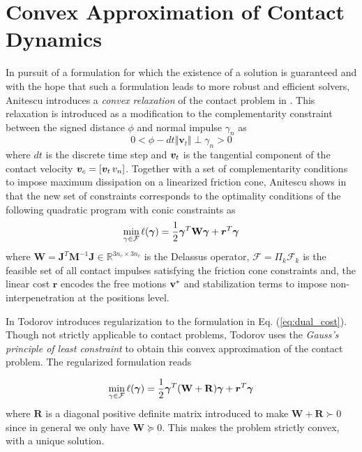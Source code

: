 \section{Convex Approximation of Contact Dynamics}
\label{sec:previous_work}


In pursuit of a formulation for which the existence of a solution is guaranteed
and with the hope that such a formulation leads to more robust and efficient
solvers, Anitescu introduces a \textit{convex relaxation} of the contact problem in
\cite{bib:anitescu2006}. This relaxation is introduced as a modification to the
complementarity constraint between the signed distance $\phi$ and normal impulse
$\gamma_n$ as
\begin{equation}
	0 < \phi - dt \Vert {\bm v}_t \Vert \perp \gamma_n > 0
	\label{eq:convex_relaxation_complementarity_condition}
\end{equation}
where $dt$ is the discrete time step and ${\bm{v}}_t$ is the tangential component
of the contact velocity ${\bm{v}}_c = [{\bm{v}}_t\,v_n]$. Together with a set of
complementarity conditions to impose maximum dissipation on a linearized
friction cone, Anitescu shows in \cite{bib:anitescu2006} that the new set of
constraints corresponds to the optimality conditions of the following quadratic
program with conic constraints as
\begin{eqnarray}
	\min_{\gamma\in \mathcal{F}} \ell(\bgamma) =
	\frac{1}{2}\bgamma^T\mathbf{W}\bgamma + {\bm r}^T
	\bgamma
	\label{eq:dual_cost}
\end{eqnarray}
where $\mathbf{W} =
\mathbf{J}^T\mathbf{M}^{-1}\mathbf{J}\in\mathbb{R}^{3n_c\times 3n_c}$ is the
Delassus operator, $\mathcal{F} = \Pi_k \mathcal{F}_k$ is the feasible set of
all contact impulses satisfying the friction cone constraints and, the linear
cost ${\bm r}$ encodes the free motions ${\mathbf{v}}^*$ and stabilization terms to
impose non-interpenetration at the positions level.

In \cite{bib:todorov2011, bib:todorov2014} Todorov introduces regularization to
the formulation in Eq. (\ref{eq:dual_cost}). Though not strictly applicable to
contact problems, Todorov uses the \textit{Gauss's principle of least
constraint} to obtain this convex approximation of the contact problem. The
regularized formulation reads

\begin{eqnarray}
	\min_{\gamma\in \mathcal{F}} \ell(\bgamma) =
	\frac{1}{2}\bgamma^T(\mathbf{W}+\mathbf{R})\bgamma + {\bm r}^T
	\bgamma
	\label{eq:dual_regularized}
\end{eqnarray}
where $\mathbf{R}$ is a diagonal positive definite matrix introduced to
make $\mathbf{W}+\mathbf{R}\succ 0$ since in general we only have $\mathbf{W}
\succeq 0$. This makes the problem strictly convex, with a unique solution. 

